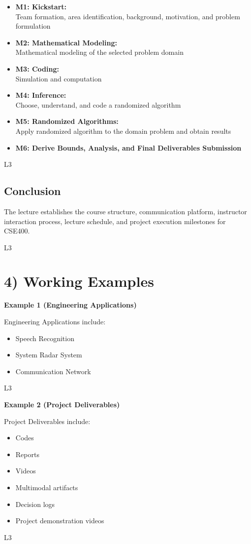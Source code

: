 \documentclass[12pt]{article}
\begin{document}
\begin{itemize}
    \item \textbf{M1: Kickstart:}\\
    Team formation, area identification, background, motivation, and problem formulation

    \item \textbf{M2: Mathematical Modeling:}\\
    Mathematical modeling of the selected problem domain

    \item \textbf{M3: Coding:}\\
    Simulation and computation

    \item \textbf{M4: Inference:}\\
    Choose, understand, and code a randomized algorithm

    \item \textbf{M5: Randomized Algorithms:}\\
    Apply randomized algorithm to the domain problem and obtain results

    \item \textbf{M6: Derive Bounds, Analysis, and Final Deliverables Submission}
\end{itemize}

L3

\subsection*{Conclusion}

The lecture establishes the course structure, communication platform, instructor interaction process, lecture schedule, and project execution milestones for CSE400.

L3


\section*{4) Working Examples}

\textbf{Example 1 (Engineering Applications)}

Engineering Applications include:

\begin{itemize}
    \item Speech Recognition
    \item System Radar System
    \item Communication Network
\end{itemize}

L3

\vspace{0.3cm}

\textbf{Example 2 (Project Deliverables)}

Project Deliverables include:

\begin{itemize}
    \item Codes
    \item Reports
    \item Videos
    \item Multimodal artifacts
    \item Decision logs
    \item Project demonstration videos
\end{itemize}

L3
\end{document}
